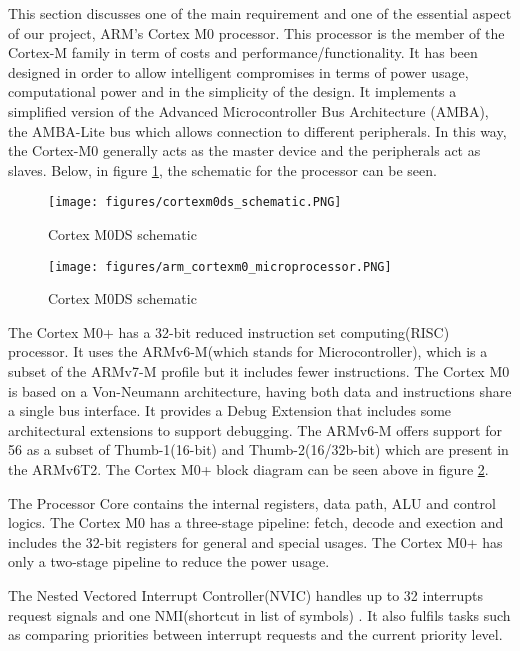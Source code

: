
This section discusses one of the main requirement and one of the essential aspect of our project, ARM’s Cortex M0 processor. This processor is the member of the Cortex-M family in term of costs and performance/functionality. It has been designed in order to allow intelligent compromises in terms of power usage, computational power and in the simplicity of the design. It implements a simplified version of the Advanced Microcontroller Bus Architecture (AMBA), the AMBA-Lite bus which allows connection to different peripherals. In this way, the Cortex-M0 generally acts as the master device and the peripherals act as slaves. Below, in figure \ref{fig:cortexm0ds}, the schematic for the processor can be seen.\\
\begin{figure}
\centering
\texttt{[image: figures/cortexm0ds\_schematic.PNG]}
\caption{Cortex M0DS schematic \label{fig:cortexm0ds}}
\end{figure}
\clearpage

\begin{figure}
\centering
\texttt{[image: figures/arm\_cortexm0\_microprocessor.PNG]}
\caption{Cortex M0DS schematic \label{fig:cortex_block}}
\end{figure}

The Cortex M0+ has a 32-bit reduced instruction set computing(RISC) processor. It uses the ARMv6-M(which stands for Microcontroller), which is a subset of the ARMv7-M profile but it includes fewer instructions. The Cortex M0 is based on a Von-Neumann architecture, having both data and instructions share a single bus interface. It provides a Debug Extension that includes some architectural extensions to support debugging. The ARMv6-M offers support for 56 as a subset of  Thumb-1(16-bit) and Thumb-2(16/32b-bit) which are present in the ARMv6T2. The Cortex M0+ block diagram can be seen above in figure \ref{fig:cortex_block}. 

The Processor Core contains the internal registers, data path, ALU and control logics. The Cortex M0 has a three-stage pipeline: fetch, decode and exection and includes the 32-bit registers for general and special usages. The Cortex M0+ has only a two-stage pipeline to reduce the power usage.

The Nested Vectored Interrupt Controller(NVIC) handles up to 32 interrupts request signals and one NMI(shortcut in list of symbols) . It also fulfils tasks such as comparing priorities between  interrupt requests and the current priority level. 


